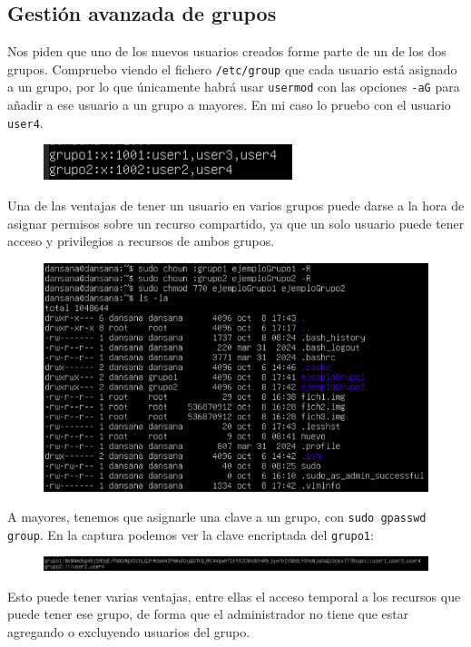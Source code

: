 \documentclass[10pt]{article}
\begin{document}
	\subsection{Gestión avanzada de grupos}
	Nos piden que uno de los nuevos usuarios creados forme parte de un de los dos grupos. Compruebo viendo el fichero \verb|/etc/group| que cada usuario está asignado a un grupo, por lo que únicamente habrá usar \verb|usermod| con las opciones \verb|-aG| para añadir a ese usuario a un grupo a mayores. En mi caso lo pruebo con el usuario \verb|user4|.
	\begin{figure}[H]
		\setlength{\abovecaptionskip}{0cm}
		\setlength{\belowcaptionskip}{0cm}
		\centering
		\includegraphics[width=0.6\linewidth]{Recursos/user2group.png}
	\end{figure}
	Una de las ventajas de tener un usuario en varios grupos puede darse a la hora de asignar permisos sobre un recurso compartido, ya que un solo usuario puede tener acceso y privilegios a recursos de ambos grupos.
	\begin{figure}[H]
		\setlength{\abovecaptionskip}{0cm}
		\setlength{\belowcaptionskip}{0cm}
		\centering
		\includegraphics[width=0.7\linewidth]{Recursos/ejemploGroup.png}
	\end{figure}
	\clearpage
	A mayores, tenemos que asignarle una clave a un grupo, con \verb|sudo gpasswd group|. En la captura podemos ver la clave encriptada del \verb|grupo1|:
	\begin{figure}[H]
		\setlength{\abovecaptionskip}{0cm}
		\setlength{\belowcaptionskip}{0cm}
		\centering
		\includegraphics[width=0.8\linewidth]{Recursos/gshadow.png}
	\end{figure}
	Esto puede tener varias ventajas, entre ellas el acceso temporal a los recursos que puede tener ese grupo, de forma que el administrador no tiene que estar agregando o excluyendo usuarios del grupo.
	
\end{document}
